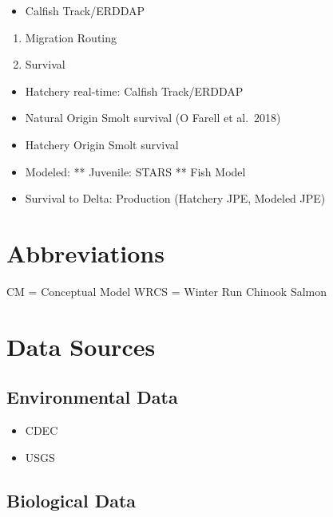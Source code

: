 \documentclass[
]{book}
\providecommand{\tightlist}{%
  \setlength{\itemsep}{0pt}\setlength{\parskip}{0pt}}
\theoremstyle{definition}
\theoremstyle{definition}
\theoremstyle{definition}
\theoremstyle{definition}
\theoremstyle{remark}
\begin{document}
\begin{itemize}
\tightlist
\item
  Calfish Track/ERDDAP
\end{itemize}

\begin{enumerate}
\def\labelenumi{\arabic{enumi}.}
\setcounter{enumi}{4}
\item
  Migration Routing
\item
  Survival
\end{enumerate}

\begin{itemize}
\tightlist
\item
  Hatchery real-time: Calfish Track/ERDDAP
\item
  Natural Origin Smolt survival (O Farell et al.~2018)
\item
  Hatchery Origin Smolt survival
\item
  Modeled: ** Juvenile: STARS ** Fish Model
\item
  Survival to Delta: Production (Hatchery JPE, Modeled JPE)
\end{itemize}

\hypertarget{abbreviations}{%
\chapter{Abbreviations}\label{abbreviations}}

CM = Conceptual Model
WRCS = Winter Run Chinook Salmon

\hypertarget{data-sources}{%
\chapter{Data Sources}\label{data-sources}}

\hypertarget{environmental-data}{%
\section{Environmental Data}\label{environmental-data}}

\begin{itemize}
\tightlist
\item
  CDEC
\item
  USGS
\end{itemize}

\hypertarget{biological-data}{%
\section{Biological Data}\label{biological-data}}
\end{document}
